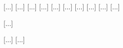 \documentclass[12pt, a4paper]{article}
\begin{document}
\begin{center}
{                                                                                                                                                                                                    [...]
                                                                                                                                                                                                    [...]
                                                                                                                                                                                                    [...]
                                                                                                                                                                                                    [...]
                                                                                                                                                                                                    [...]
                                                                                                                                                                                                    [...]
                                                                                                                                                                                                    [...]
                                                                                                                                                                                                    [...]
                                                                                                                                                                                                    [...]
                                                                                                                                                                                                    [...]

                                                                                                                                                                                                    [...]

                                                                                                                                                                                                    [...]
                                                                                                                                                                                                    [...]

}
\end{center}
\end{document}
